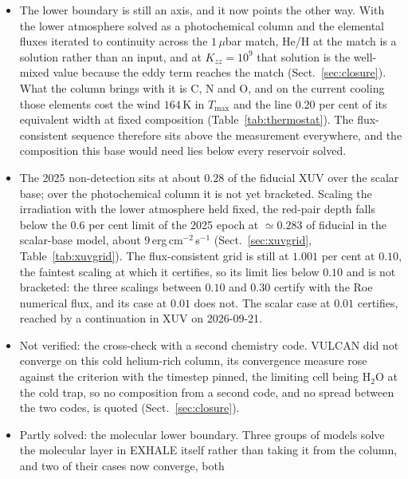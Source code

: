 \documentclass[english,a4paper]{my_memo}
\begin{document}
\begin{itemize}
      conditional on the assumed XUV spectrum, and weakly conditional on the
      eddy coefficient, as $K_{zz}^{-0.115}$ wherever the eddy term acts at
      all.
\item The lower boundary is still an axis, and it now points the other way.
      With the lower atmosphere solved as a photochemical column
      and the elemental fluxes iterated to continuity across the
      $1\,\mu$bar match, He/H at the match is a solution rather than an
      input, and at $K_{zz} = 10^{9}$ that solution is the well-mixed value
      because the eddy term reaches the match (Sect.~\ref{sec:closure}).
      What the column brings with it is C, N and O, and on the current
      cooling those elements cost the wind $164$\,K in $T_{\max}$ and the
      line $0.20$ per cent of its equivalent width at fixed composition
      (Table~\ref{tab:thermostat}). The flux-consistent sequence therefore
      sits above the measurement everywhere, and the composition this base
      would need lies below every reservoir solved.
\item The 2025 non-detection sits at about $0.28$ of the fiducial XUV over
      the scalar base; over the photochemical column it is not yet
      bracketed. Scaling the irradiation with the lower atmosphere held
      fixed, the red-pair depth falls below the $0.6$ per cent limit of the
      2025 epoch at $\simeq\!0.283$ of fiducial in the scalar-base model,
      about $9$\,erg\,cm$^{-2}$\,s$^{-1}$
      (Sect.~\ref{sec:xuvgrid}, Table~\ref{tab:xuvgrid}). The
      flux-consistent grid is still at $1.001$ per cent at $0.10$, the
      faintest scaling at which it certifies, so its limit lies below $0.10$
      and is not bracketed: the three scalings between $0.10$ and $0.30$
      certify with the Roe numerical flux, and its case at $0.01$ does not.
      The scalar case at $0.01$ certifies, reached by a continuation in XUV
      on 2026-09-21.
\item Not verified: the cross-check with a second chemistry code. VULCAN
      did not converge on this cold helium-rich column, its convergence
      measure rose against the criterion with the timestep pinned, the
      limiting cell being H$_2$O at the cold trap, so no composition from
      a second code, and no spread between the two codes, is quoted
      (Sect.~\ref{sec:closure}).
\item Partly solved: the molecular lower boundary. Three groups of models
      solve the molecular layer in EXHALE itself rather than taking it from
      the column, and two of their cases now converge, both

\end{itemize}
\end{document}
